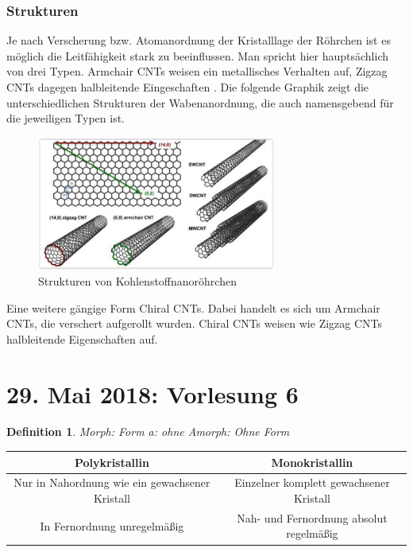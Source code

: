 \documentclass[12pt,a4paper]{report}%
\let\harvardleftorig\harvardleft
\newtheorem{definition}[satz]{Definition}
\numberwithin{equation}{section}
\newcommand\citevgl
{\def\harvardleft{(vgl.\ \global\let\harvardleft\harvardleftorig}%
 \cite
}
\numberwithin{equation}{subsection}
\begin{document}
    \subsubsection{Strukturen}
      Je nach Verscherung bzw. Atomanordnung der Kristalllage der Röhrchen ist es möglich die Leitfähigkeit stark zu beeinflussen. Man spricht hier hauptsächlich von drei Typen. Armchair CNTs weisen ein metallisches Verhalten auf, Zigzag CNTs dagegen halbleitende Eingeschaften \citevgl{Chandrasekhar2018ConductingPolymers}. Die folgende Graphik zeigt die unterschiedlichen Strukturen der Wabenanordnung, die auch namensgebend für die jeweiligen Typen ist.
		\begin{figure}[H] 
		  \centering
		  \includegraphics[width=0.7\textwidth]{structures.png}
		  \caption{Strukturen von Kohlenstoffnanoröhrchen\protect\cite{Chandrasekhar2018ConductingPolymers}}
		  \label{fig:cnt_structures}
		\end{figure}
		Eine weitere gängige Form Chiral CNTs. Dabei handelt es sich um Armchair CNTs, die verschert aufgerollt wurden. Chiral CNTs weisen wie Zigzag CNTs halbleitende Eigenschaften auf.
\newpage

	\section{29. Mai 2018: Vorlesung 6}
	\begin{definition}
	  Morph: Form\newline
	  a: ohne\newline
	  Amorph: Ohne Form
	\end{definition}
	\begin{table}[H]
	  \centering
	  \begin{tabular}{c | c}
	    Polykristallin & Monokristallin \\ \hline
	    Nur in Nahordnung wie ein gewachsener Kristall & Einzelner komplett gewachsener Kristall \\
	    In Fernordnung unregelmäßig & Nah- und Fernordnung absolut regelmäßig
	  \end{tabular}
	\end{table}
	
\end{document}
